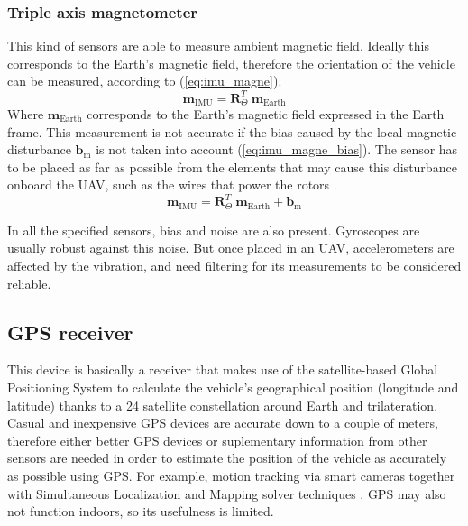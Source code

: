 \documentclass[journal, twoside]{IEEEtran}
\newcommand*{\subb}[1]{_{\mathrm{#1}}}
\begin{document}
	\subsubsection{Triple axis magnetometer} This kind of sensors are able to measure ambient magnetic field. Ideally this corresponds to the Earth's magnetic field, therefore the orientation of the vehicle can be measured, according to (\ref{eq:imu_magne}).
	\begin{equation} \label{eq:imu_magne}
	\bm{m}\subb{IMU}= \bm{R}^T_\Theta \  \bm{m}\subb{Earth}
	\end{equation}
	Where $\bm{m}\subb{Earth}$ corresponds to the Earth's magnetic field expressed in the Earth frame. This measurement is not accurate if the bias caused by the local magnetic disturbance $\bm{b}\subb{m}$ is not taken into account (\ref{eq:imu_magne_bias}). The sensor has to be placed as far as possible from the elements that may cause this disturbance onboard the UAV, such as the wires that power the rotors \cite{modelling_control_mahony}.
	\begin{equation} \label{eq:imu_magne_bias}
	\bm{m}\subb{IMU}= \bm{R}^T_\Theta \  \bm{m}\subb{Earth} + \bm{b}\subb{m}
	\end{equation}
	
	In all the specified sensors, bias and noise are also present. Gyroscopes are usually robust against this noise. But once placed in an UAV, accelerometers are affected by the vibration, and need filtering for its measurements to be considered reliable.
	
	\subsection{GPS receiver}
	This device is basically a receiver that makes use of the satellite-based Global Positioning System to calculate the vehicle's geographical position (longitude and latitude) thanks to a 24 satellite constellation around Earth and trilateration. Casual and inexpensive GPS devices are accurate down to a couple of meters, therefore either better GPS devices or suplementary information from other sensors are needed in order to estimate the position of the vehicle as accurately as possible using GPS. For example, motion tracking via smart cameras together with Simultaneous Localization and Mapping solver techniques \cite{modelling_control_mahony}. GPS may also not function indoors, so its usefulness is limited.
	
\end{document}
